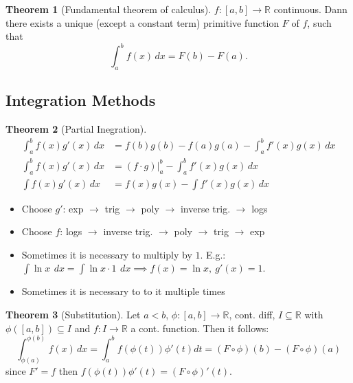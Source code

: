 \documentclass[a4paper, 10pt]{article}
\theoremstyle{definition}
\theoremstyle{named}
\newtheorem*{ntheorem_wrapper}{Theorem}
\newenvironment{ntheorem}%
    {\begin{mdframed}[style=important]\begin{ntheorem_wrapper}}%
    {\end{ntheorem_wrapper}\end{mdframed}}
\newcommand{\R}{\mathbb{R}}
\begin{document}
\begin{ntheorem}[Fundamental theorem of calculus]
    $f: [a, b] \to \R$ continuous. Dann there exists a unique (except a constant term) primitive function $F$ of $f$, such that 
    $$\int_a^b f(x) \,dx = F(b) - F(a).$$
\end{ntheorem}

\subsection{Integration Methods}
\begin{ntheorem}[Partial Inegration]
    \begin{align*}
        \int_a^b f(x) g'(x) \,dx &= f(b)g(b) - f(a)g(a) - \int_a^b f'(x)g(x) \,dx \\
        \int_a^b f(x) g'(x) \,dx &= (f \cdot g)|_a^b - \int_a^b f'(x)g(x) \,dx \\
        \int f(x)g'(x) \,dx &= f(x) g(x) - \int f'(x) g(x) \,dx
    \end{align*}
\end{ntheorem}
\begin{itemize}
    \item Choose $g'$: exp $\rightarrow$ trig $\rightarrow$ poly $\rightarrow$ inverse trig. $\rightarrow$ logs
    \item Choose $f$: logs $\rightarrow$ inverse trig. $\rightarrow$ poly $\rightarrow$ trig $\rightarrow$ exp
    \item Sometimes it is necessary to multiply by $1$. E.g.: $\int \ln x \ \,dx = \int \ln x \cdot 1 \ \,dx \implies f(x) = \ln x, \ g'(x) = 1$.
    \item Sometimes it is necessary to to it multiple times
\end{itemize}

\begin{ntheorem}[Substitution]
    Let $a < b$, $\phi: [a, b] \to \R$, cont. diff, $I \subseteq \R$ with $\phi([a, b]) \subseteq I$ and $f: I \to \R$ a cont. function. Then it follows:
    $$\int_{\phi(a)}^{\phi(b)} f(x) \,dx = \int_a^b f(\phi(t)) \phi'(t) dt = (F \circ \phi)(b) - (F \circ \phi)(a)$$
    since $F'=f$ then $f(\phi(t))\phi'(t) = (F \circ \phi)'(t)$.
\end{ntheorem}
\end{document}
